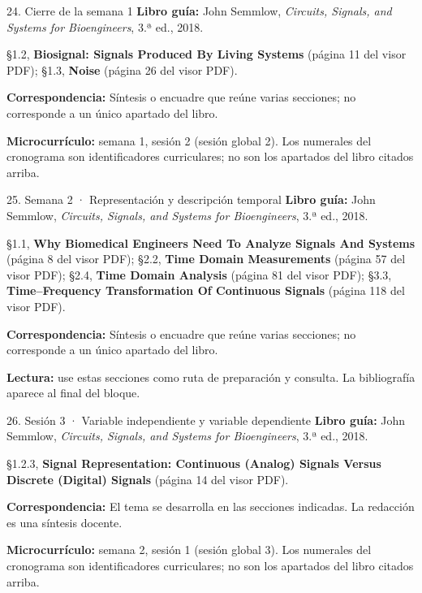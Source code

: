 \documentclass[
  10pt,
  ignorenonframetext,
  aspectratio=169,
  spanish,
]{beamer}
\begin{document}
\begin{frame}{24. Cierre de la semana 1}
\label{cierre-de-la-semana-1}
\textbf{Libro guía:} John Semmlow, \emph{Circuits, Signals, and Systems
for Bioengineers}, 3.ª ed., 2018.

§1.2, \textbf{Biosignal: Signals Produced By Living Systems} (página 11
del visor PDF); §1.3, \textbf{Noise} (página 26 del visor PDF).

\textbf{Correspondencia:} Síntesis o encuadre que reúne varias
secciones; no corresponde a un único apartado del libro.

\textbf{Microcurrículo:} semana 1, sesión 2 (sesión global 2). Los
numerales del cronograma son identificadores curriculares; no son los
apartados del libro citados arriba.
\end{frame}

\begin{frame}{25. Semana 2 · Representación y descripción temporal}
\label{semana-2-representaciuxf3n-y-descripciuxf3n-temporal}
\textbf{Libro guía:} John Semmlow, \emph{Circuits, Signals, and Systems
for Bioengineers}, 3.ª ed., 2018.

§1.1, \textbf{Why Biomedical Engineers Need To Analyze Signals And
Systems} (página 8 del visor PDF); §2.2, \textbf{Time Domain
Measurements} (página 57 del visor PDF); §2.4, \textbf{Time Domain
Analysis} (página 81 del visor PDF); §3.3, \textbf{Time--Frequency
Transformation Of Continuous Signals} (página 118 del visor PDF).

\textbf{Correspondencia:} Síntesis o encuadre que reúne varias
secciones; no corresponde a un único apartado del libro.

\textbf{Lectura:} use estas secciones como ruta de preparación y
consulta. La bibliografía aparece al final del bloque.
\end{frame}

\begin{frame}{26. Sesión 3 · Variable independiente y variable
dependiente}
\label{sesiuxf3n-3-variable-independiente-y-variable-dependiente}
\textbf{Libro guía:} John Semmlow, \emph{Circuits, Signals, and Systems
for Bioengineers}, 3.ª ed., 2018.

§1.2.3, \textbf{Signal Representation: Continuous (Analog) Signals
Versus Discrete (Digital) Signals} (página 14 del visor PDF).

\textbf{Correspondencia:} El tema se desarrolla en las secciones
indicadas. La redacción es una síntesis docente.

\textbf{Microcurrículo:} semana 2, sesión 1 (sesión global 3). Los
numerales del cronograma son identificadores curriculares; no son los
apartados del libro citados arriba.
\end{frame}
\end{document}

